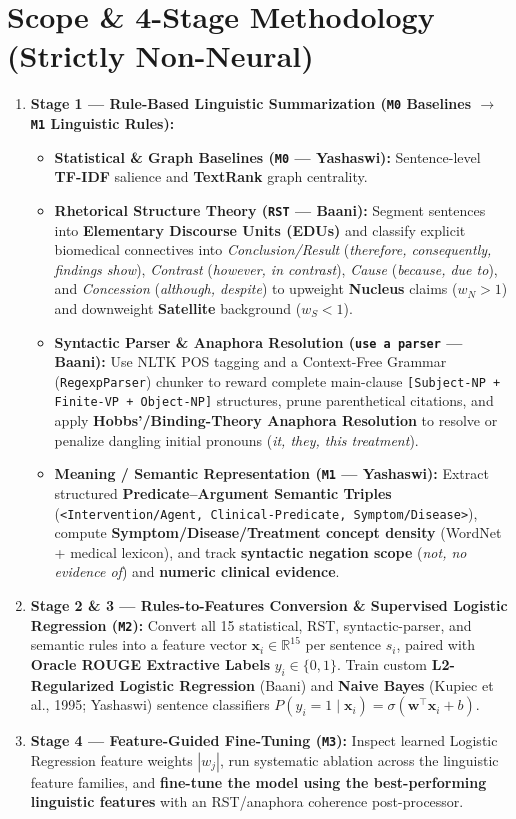 \documentclass[11pt,a4paper]{article}
\begin{document}
\section{Scope \& 4-Stage Methodology (Strictly Non-Neural)}
\begin{enumerate}
    \item \textbf{Stage 1 --- Rule-Based Linguistic Summarization (\texttt{M0} Baselines $\to$ \texttt{M1} Linguistic Rules):}
    \begin{itemize}
        \item \textbf{Statistical \& Graph Baselines (\texttt{M0} --- Yashaswi):} Sentence-level \textbf{TF-IDF} salience and \textbf{TextRank} graph centrality.
        \item \textbf{Rhetorical Structure Theory (\texttt{RST} --- Baani):} Segment sentences into \textbf{Elementary Discourse Units (EDUs)} and classify explicit biomedical connectives into \textit{Conclusion/Result} (\textit{therefore, consequently, findings show}), \textit{Contrast} (\textit{however, in contrast}), \textit{Cause} (\textit{because, due to}), and \textit{Concession} (\textit{although, despite}) to upweight \textbf{Nucleus} claims ($w_N > 1$) and downweight \textbf{Satellite} background ($w_S < 1$).
        \item \textbf{Syntactic Parser \& Anaphora Resolution (\texttt{use a parser} --- Baani):} Use NLTK POS tagging and a Context-Free Grammar (\texttt{RegexpParser}) chunker to reward complete main-clause \texttt{[Subject-NP + Finite-VP + Object-NP]} structures, prune parenthetical citations, and apply \textbf{Hobbs'/Binding-Theory Anaphora Resolution} to resolve or penalize dangling initial pronouns (\textit{it, they, this treatment}).
        \item \textbf{Meaning / Semantic Representation (\texttt{M1} --- Yashaswi):} Extract structured \textbf{Predicate--Argument Semantic Triples} (\texttt{<Intervention/Agent, Clinical-Predicate, Symptom/Disease>}), compute \textbf{Symptom/Disease/Treatment concept density} (WordNet + medical lexicon), and track \textbf{syntactic negation scope} (\textit{not, no evidence of}) and \textbf{numeric clinical evidence}.
    \end{itemize}
    \item \textbf{Stage 2 \& 3 --- Rules-to-Features Conversion \& Supervised Logistic Regression (\texttt{M2}):} Convert all 15 statistical, RST, syntactic-parser, and semantic rules into a feature vector $\mathbf{x}_i \in \mathbb{R}^{15}$ per sentence $s_i$, paired with \textbf{Oracle ROUGE Extractive Labels} $y_i \in \{0, 1\}$. Train custom \textbf{L2-Regularized Logistic Regression} (Baani) and \textbf{Naive Bayes} (Kupiec et al., 1995; Yashaswi) sentence classifiers $P(y_i = 1 \mid \mathbf{x}_i) = \sigma(\mathbf{w}^\top \mathbf{x}_i + b)$.
    \item \textbf{Stage 4 --- Feature-Guided Fine-Tuning (\texttt{M3}):} Inspect learned Logistic Regression feature weights $|w_j|$, run systematic ablation across the linguistic feature families, and \textbf{fine-tune the model using the best-performing linguistic features} with an RST/anaphora coherence post-processor.
\end{enumerate}
\end{document}
